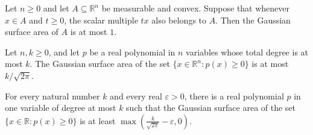 \begin{theorem}
\label{BooleanAnalysis.GaussianSpace.surfaceArea_convex_cone_le}
\leanok
{}
Let $n\ge 0$ and let $A\subseteq\mathbb R^n$ be measurable and convex. Suppose that
whenever $x\in A$ and $t\ge 0$, the scalar multiple $tx$ also belongs to $A$. Then the
Gaussian surface area of $A$ is at most $1$.
\end{theorem}

\begin{theorem}
\label{BooleanAnalysis.GaussianSpace.surfaceArea_polynomial_threshold_le}
\leanok
{}
Let $n,k\ge0$, and let $p$ be a real polynomial in $n$ variables whose total degree is
at most $k$. The Gaussian surface area of the set $\{x\in\mathbb R^n:p(x)\ge0\}$ is at
most $k/\sqrt{2\pi}$.
\end{theorem}

\begin{theorem}
\label{BooleanAnalysis.GaussianSpace.exists_polynomial_threshold_surfaceArea_ge}
\leanok
{}
For every natural number $k$ and every real $\varepsilon>0$, there is a real polynomial
$p$ in one variable of degree at most $k$ such that the Gaussian surface area of the set
$\{x\in\mathbb R:p(x)\ge 0\}$ is at least
$\max\!\left(\frac{k}{\sqrt{2\pi}}-\varepsilon,0\right)$.
\end{theorem}

